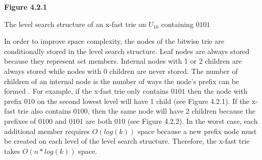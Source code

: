 \documentclass{article}
\begin{document}
\begin{center}
    \centering
    \textbf{Figure 4.2.1}\par\medskip
    The level search structure of an x-fast trie on $U_{16}$ containing $0101$
\end{center}

\noindent
In order to improve space complexity, the nodes of the bitwise trie are conditionally stored in the level search structure. Leaf nodes are always stored because they represent set members. Internal nodes with 1 or 2 children are always stored while nodes with 0 children are never stored. The number of children of an internal node is the number of ways the node's prefix can be formed \cite{WILLARD198381}. For example, if the x-fast trie only contains $0101$ then the node with prefix $010$ on the second lowest level will have 1 child (see Figure 4.2.1). If the x-fast trie also contains $0100$, then the same node will have 2 children because the prefixes of $0100$ and $0101$ are both $010$ (see Figure 4.2.2). In the worst case, each additional member requires $O(log(k))$ space because a new prefix node must be created on each level of the level search structure. Therefore, the x-fast trie takes $O(n*log(k))$ space.
\\
\end{document}
